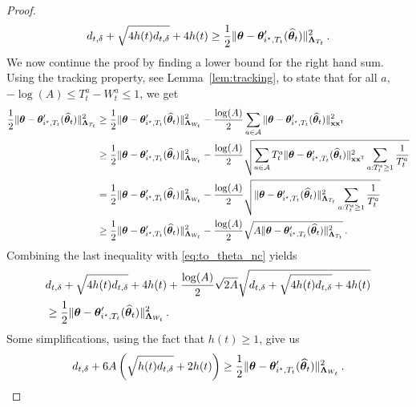 \begin{proof}
\begin{equation}
\label{eq:to_theta_nc}
d_{t,\delta} + \sqrt{4 h(t) d_{t,\delta}} +4h(t) \geq \frac{1}{2} \Vert {\boldsymbol \theta} - {\boldsymbol \theta}'_{i^\star,T_t}(\widehat{{\boldsymbol \theta}}_t) \Vert_{{\boldsymbol \Lambda}_{T_t}}^2 \,.
\end{equation}
We now continue the proof by finding a lower bound for the right hand sum. Using the tracking property, see Lemma~\ref{lem:tracking}, to state that for all $a$, $- \log(A) \le T_t^{a} - W_t^{a}\le 1$, we get
\begin{align*}
\frac{1}{2} \Vert {\boldsymbol \theta} - {\boldsymbol \theta}'_{i^\star,T_t}(\widehat{{\boldsymbol \theta}}_t) \Vert_{{\boldsymbol \Lambda}_{T_t}}^2
&\ge \frac{1}{2} \Vert {\boldsymbol \theta} - {\boldsymbol \theta}'_{i^\star,T_t}(\widehat{{\boldsymbol \theta}}_t) \Vert_{{\boldsymbol \Lambda}_{W_t}}^2
	- \frac{\log(A)}{2} \sum_{a\in\mathcal{A}} \Vert {\boldsymbol \theta} - {\boldsymbol \theta}'_{i^\star,T_t}(\widehat{{\boldsymbol \theta}}_t) \Vert_{{\bf x}{\bf x}^\mathsf{\scriptscriptstyle T}}^2
\\
&\ge \frac{1}{2} \Vert {\boldsymbol \theta} - {\boldsymbol \theta}'_{i^\star,T_t}(\widehat{{\boldsymbol \theta}}_t) \Vert_{{\boldsymbol \Lambda}_{W_t}}^2
	- \frac{\log(A)}{2} \sqrt{\sum_{a\in\mathcal{A}} T_t^{a}\Vert {\boldsymbol \theta} - {\boldsymbol \theta}'_{i^\star,T_t}(\widehat{{\boldsymbol \theta}}_t) \Vert_{{\bf x}{\bf x}^\mathsf{\scriptscriptstyle T}}^2\sum_{a:T_t^a\ge 1} \frac{1}{T_t^a}   }
\\
&=   \frac{1}{2} \Vert {\boldsymbol \theta} - {\boldsymbol \theta}'_{i^\star,T_t}(\widehat{{\boldsymbol \theta}}_t) \Vert_{{\boldsymbol \Lambda}_{W_t}}^2
	- \frac{\log(A)}{2} \sqrt{\Vert {\boldsymbol \theta} - {\boldsymbol \theta}'_{i^\star,T_t}(\widehat{{\boldsymbol \theta}}_t) \Vert_{{\boldsymbol \Lambda}_{T_t}}^2\sum_{a:T_t^a\ge 1} \frac{1}{T_t^a}   }
\\
&\ge \frac{1}{2} \Vert {\boldsymbol \theta} - {\boldsymbol \theta}'_{i^\star,T_t}(\widehat{{\boldsymbol \theta}}_t) \Vert_{{\boldsymbol \Lambda}_{W_t}}^2
	-\frac{\log(A)}{2} \sqrt{ A \Vert {\boldsymbol \theta} - {\boldsymbol \theta}'_{i^\star,T_t}(\widehat{{\boldsymbol \theta}}_t) \Vert_{{\boldsymbol \Lambda}_{T_t}}^2  }\,.
\end{align*}
Combining the last inequality with \eqref{eq:to_theta_nc} yields
\begin{align*}
    &d_{t,\delta} + \sqrt{4 h(t) d_{t,\delta}} +4h(t)+\frac{\log(A)}{2} \sqrt{2 A}\sqrt{d_{t,\delta} + \sqrt{4 h(t) d_{t,\delta}} +4h(t)}\\
    &\geq \frac{1}{2} \Vert {\boldsymbol \theta} - {\boldsymbol \theta}'_{i^\star,T_t}(\widehat{{\boldsymbol \theta}}_t) \Vert_{{\boldsymbol \Lambda}_{W_t}}^2\,.
\end{align*}
Some simplifications, using the fact that $h(t)\geq 1 $, give us
\begin{equation}
  \label{eq:to_tW_nc}
  d_{t,\delta}+6A\left( \sqrt{h(t)d_{t,\delta}}+2h(t)\right)
  \geq  \frac{1}{2} \Vert \btheta - \btheta'_{\istar,T_t}(\hat{\btheta}_t) \Vert_{\bLambda_{W_t}}^2\,.

\end{equation}
\end{proof}
